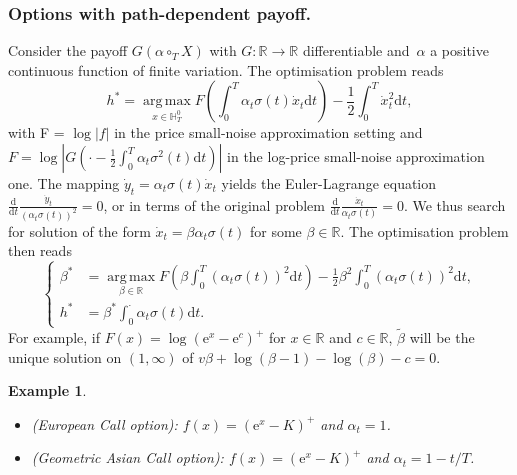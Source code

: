 \documentclass{amsart}[11pt]
\numberwithin{equation}{section}
\numberwithin{theorem}{subsection}
\numberwithin{proposition}{subsection}
\numberwithin{definition}{subsection}
\numberwithin{lemma}{subsection}
\newtheorem*{example}{Example}
\numberwithin{assumption}{subsection}
\newcommand{\HH}{\mathbb{H}}
\newcommand{\RR}{\mathbb{R}}
\newcommand{\cT}{\circ_{T}}
\newcommand{\D}{\mathrm{d}}
\newcommand{\E}{\mathrm{e}}
\DeclareMathOperator*{\argmax}{arg\,max}
\begin{document}
{\subsubsection{Options with path-dependent payoff.}
Consider the payoff $G(\alpha\cT X)$ with $G:\RR \to \RR$ differentiable and~$\alpha$ 
a positive continuous function of finite variation. 
The optimisation problem reads
$$
h^{*} = \argmax\limits_{x \in \HH_T^0} F\left(\int_0^T \alpha_t \sigma(t) \dot{x}_t \D t\right) - \frac{1}{2}\int_0^T \dot{x}_t^2 \D t,
$$
with F = $\log|f|$ in the price small-noise approximation setting
and $F = \log\left|G(\cdot - \frac{1}{2}\int_0^T\alpha_t \sigma^2(t) \D t)\right|$ in the log-price small-noise approximation one. 
The mapping $\dot{y}_t = \alpha_t\sigma(t)\dot{x}_t$
yields the Euler-Lagrange equation
$
\frac{\D}{\D t}\frac{\dot{y}_t}{(\alpha_t\sigma(t))^2} = 0$,
or in terms of the original problem
$\frac{\D}{\D t}\frac{\dot{x}_t}{\alpha_t\sigma(t)} = 0$.
We thus search for solution of the form $\dot{x}_t = \beta \alpha_t\sigma(t)$ for some $\beta \in\RR$. 
The optimisation problem then reads
\[
\begin{cases}
\beta^{*} &= \displaystyle \argmax\limits_{\beta \in\RR} F\left(\beta \int_0^T (\alpha_t \sigma(t))^2 \D t\right)  - \frac{1}{2}\beta^2 \int_0^T (\alpha_t \sigma(t))^2 \D t,\\
h^{*} &= \displaystyle \beta^{*} \int_{0}^{\cdot} \alpha_t \sigma(t) \D t.
\end{cases}
\]
For example, if $F(x) = \log(\E^x - \E^c)^+$ for $x \in\RR$ and $c \in\RR$, $\widetilde{\beta}$ will be the unique solution on $(1,\infty)$ of
$v\beta + \log(\beta - 1) - \log(\beta) - c = 0$.
\begin{example}\ 
\begin{itemize}
\item \textup{(European Call option):} $f(x) = (\E^{x} - K)^+$ and $\alpha_t=1$.
\item \textup{(Geometric Asian Call option):} $f(x) = (\E^{x} - K)^+$ and $\alpha_t=1 - t/T$. 
\end{itemize}
\end{example}

}
\end{document}

